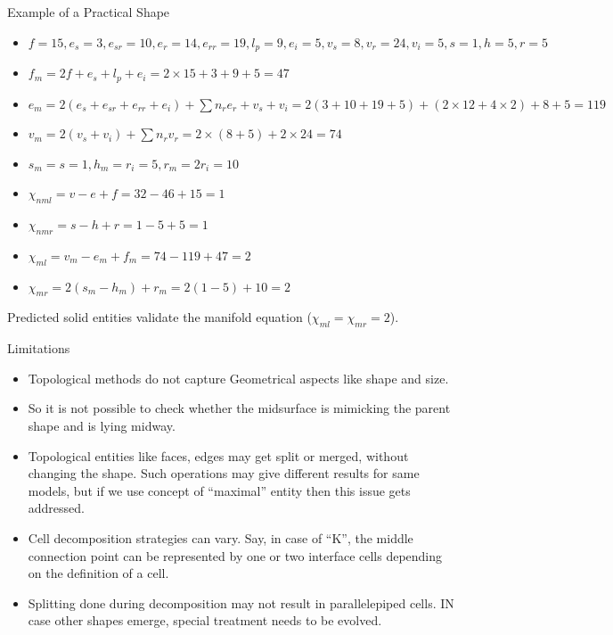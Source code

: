 \begin{frame}{Example of a Practical Shape}
\begin{itemize}[noitemsep,label=\textbullet,topsep=2pt,parsep=2pt,partopsep=2pt]
\item $f = 15, e_s = 3, e_{sr} = 10, e_r = 14, e_{rr} = 19, l_p = 9 ,e_i=5,v_s = 8,v_r =24, v_i= 5, s=1,h=5,r=5$
\item $f_m = 2f+e_s+ l_p +e_i = 2 \times 15 + 3 + 9 + 5 = 47$
\item $e_m = 2(e_s+e_{sr}+e_{rr}+e_i )+ \sum n_{r} e_{r}+v_s+v_i = 2(3+10+19 + 5)+ (2\times 12 + 4 \times 2)+8+5 = 119$
\item $v_m = 2(v_s+ v_i) + \sum n_{r} v_r=2\times (8 + 5)  + 2 \times 24=74$
\item $s_m =s = 1, h_m = r_i  = 5, r_m = 2r_i = 10$
\item $\chi_{nml} = v-e+f = 32-46+15 = 1$
\item $\chi_{nmr}=s-h+r=1-5+5 = 1$
\item $\chi_{ml} = v_m-e_m+f_m =74-119+47= 2$
\item $\chi_{mr}=2(s_m-h_m )+r_m= 2(1-5)+10 = 2$
\end{itemize}
Predicted solid entities validate the manifold equation ($\chi_{ml} = \chi_{mr} = 2$). 
\end{frame}

\begin{frame}{Limitations}
\begin{itemize}[noitemsep,label=\textbullet,topsep=2pt,parsep=2pt,partopsep=2pt]
\item Topological methods do not capture Geometrical aspects like shape and size.
\item So it is not possible to check whether the midsurface is mimicking the parent shape and is lying midway.
\item Topological entities like faces, edges may get split or merged, without changing the shape. Such operations may give different results for same models, but if we use concept of ``maximal'' entity then this issue gets addressed.
\item Cell decomposition strategies can vary. Say, in case of ``K'', the middle connection point can be represented by one or two interface cells depending on the  definition of a cell. 
\item Splitting done during decomposition may not result in parallelepiped cells. IN case other shapes emerge, special treatment needs to be evolved.
\end{itemize}
\end{frame}
